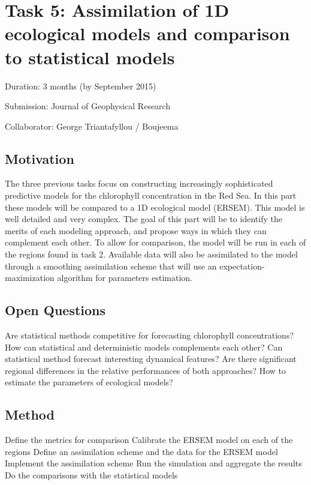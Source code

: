
\section{Task 5: Assimilation of 1D ecological models and comparison to statistical models}

Duration: 3 months (by September 2015)

Submission: Journal of Geophysical Research 

Collaborator: George Triantafyllou / Boujeema

\subsection{Motivation}

The three previous tasks focus on constructing increasingly sophisticated predictive models for the chlorophyll concentration in the Red Sea. In this part these models will be compared to a 1D ecological model (ERSEM). This model is well detailed and very complex. The goal of this part will be to identify the merits of each modeling approach, and propose ways in which they can complement each other. To allow for comparison, the model will be run in each of the regions found in task 2. Available data will also be assimilated to the model through a smoothing assimilation scheme that will use an expectation-maximization algorithm for parameters estimation. 

\subsection{Open Questions}

Are statistical methods competitive for forecasting chlorophyll concentrations?
How can statistical and deterministic models complements each other?
Can statistical method forecast interesting dynamical features?
Are there significant regional differences in the relative performances of both approaches?
How to estimate the parameters of ecological models? 

\subsection{Method}

Define the metrics for comparison
Calibrate the ERSEM model on each of the regions
Define an assimilation scheme and the data for the ERSEM model
Implement the assimilation scheme
Run the simulation and aggregate the results
Do the comparisons with the statistical models

